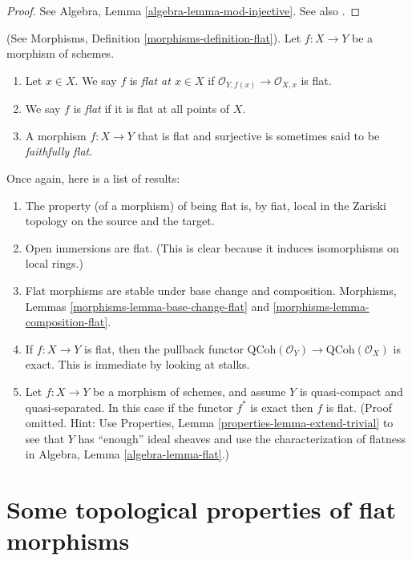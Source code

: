 \begin{proof}
See Algebra, Lemma \ref{algebra-lemma-mod-injective}.
See also \cite[Section 20]{MatCA}.
\end{proof}

\begin{definition}
\label{definition-flat-schemes}
(See Morphisms, Definition \ref{morphisms-definition-flat}).
Let $f : X \to Y$ be a morphism of schemes.
\begin{enumerate}
\item Let $x \in X$. We say $f$ is {\it flat at $x \in X$}
if $\mathcal{O}_{Y, f(x)} \to \mathcal{O}_{X, x}$ is flat.
\item We say $f$ is {\it flat} if it is flat at all points of $X$.
\item A morphism $f : X \to Y$ that is flat and surjective is sometimes
said to be {\it faithfully flat}.
\end{enumerate}
\end{definition}

\noindent
Once again, here is a list of results:
\begin{enumerate}
\item The property (of a morphism) of being flat is, by fiat,
local in the Zariski topology on the source and the target.
\item Open immersions are flat. (This is clear because it induces isomorphisms
on local rings.)
\item Flat morphisms are stable under base change and composition.
Morphisms, Lemmas \ref{morphisms-lemma-base-change-flat} and
\ref{morphisms-lemma-composition-flat}.
\item If $f : X \to Y$ is flat, then the pullback functor
$\text{QCoh}(\mathcal{O}_Y) \to \text{QCoh}(\mathcal{O}_X)$ is exact.
This is immediate by looking at stalks.
\item Let $f : X \to Y$ be a morphism of schemes, and assume $Y$
is quasi-compact and quasi-separated. In this case
if the functor $f^*$ is exact then $f$ is flat.
(Proof omitted. Hint: Use
Properties, Lemma \ref{properties-lemma-extend-trivial} to see that
$Y$ has ``enough'' ideal sheaves and use the characterization of
flatness in Algebra, Lemma \ref{algebra-lemma-flat}.)
\end{enumerate}

\section{Some topological properties of flat morphisms}
\label{section-topological-flat}

